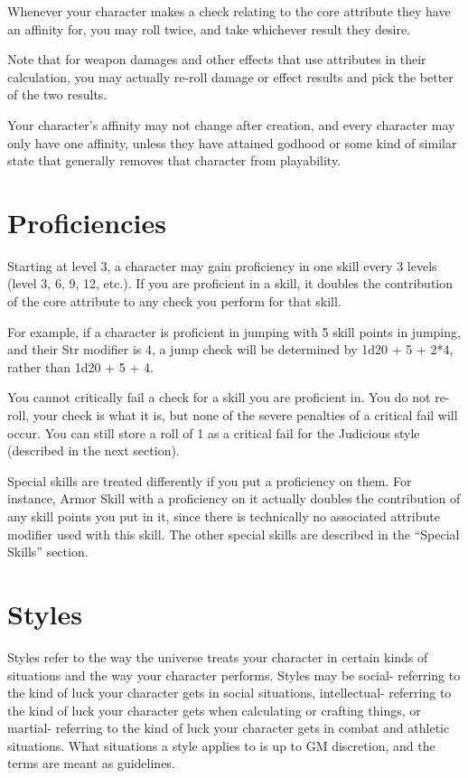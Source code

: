 Whenever your character makes a check relating to the core attribute they have an affinity for, you may roll twice, and take whichever result they desire.

Note that for weapon damages and other effects that use attributes in their calculation, you may actually re-roll damage or effect results and pick the better of the two results.

Your character’s affinity may not change after creation, and every character may only have one affinity, unless they have attained godhood or some kind of similar state that generally removes that character from playability.

\section{Proficiencies}
Starting at level 3, a character may gain proficiency in one skill every 3 levels (level 3, 6, 9, 12, etc.). If you are proficient in a skill, it doubles the contribution of the core attribute to any check you perform for that skill.

For example, if a character is proficient in jumping with 5 skill points in jumping, and their Str modifier is 4, a jump check will be determined by 1d20 + 5 + 2*4, rather than 1d20 + 5 + 4.

You cannot critically fail a check for a skill you are proficient in. You do not re-roll, your check is what it is, but none of the severe penalties of a critical fail will occur. You can still store a roll of 1 as a critical fail for the Judicious style (described in the next section).

Special skills are treated differently if you put a proficiency on them. For instance, Armor Skill with a proficiency on it actually doubles the contribution of any skill points you put in it, since there is technically no associated attribute modifier used with this skill. The other special skills are described in the ``Special Skills'' section.

\section{Styles}
Styles refer to the way the universe treats your character in certain kinds of situations and the way your character performs. Styles may be social- referring to the kind of luck your character gets in social situations, intellectual- referring to the kind of luck your character gets when calculating or crafting things, or martial- referring to the kind of luck your character gets in combat and athletic situations. What situations a style applies to is up to GM discretion, and the terms are meant as guidelines.

